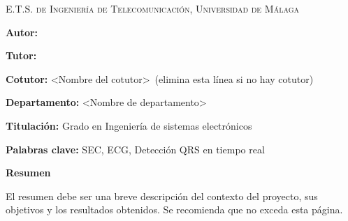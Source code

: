 
\pagestyle{fancy}
\renewcommand{\headrulewidth}{0pt}

\begin{center}
	\scshape
	E.T.S. de Ingeniería de Telecomunicación, Universidad de Málaga 
\end{center}

\bigskip

\begin{center}
	\Large \scshape
	\textbf{\tfgtitlename}
\end{center}

\bigskip \bigskip \bigskip

\begin{minipage}{\textwidth}

\textbf{Autor:} \tfgauthorname

\medskip

\textbf{Tutor:} \tfgtutorname

\medskip

\textbf{Cotutor:} <Nombre del cotutor>\ (elimina esta línea si no hay cotutor)

\medskip

\textbf{Departamento:} <Nombre de departamento>

\medskip

\textbf{Titulación:} Grado en Ingeniería de sistemas electrónicos

\medskip

\textbf{Palabras clave:} SEC, ECG, Detección QRS en tiempo real

\bigskip \bigskip


\end{minipage}

\begin{center}
	\textbf{Resumen}
\end{center}

El resumen debe ser una breve descripción del contexto del proyecto,
sus objetivos y los resultados obtenidos. Se recomienda que no exceda
esta página.


\blankpage
